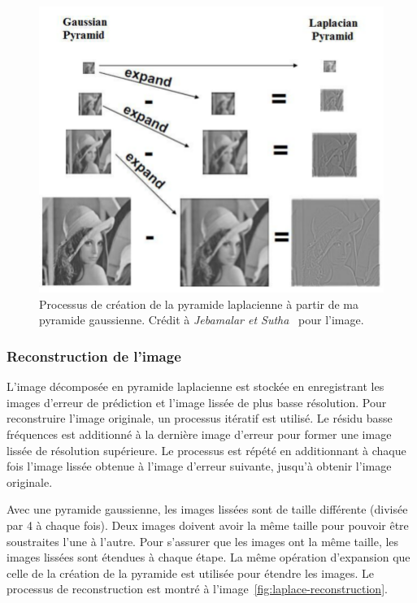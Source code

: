 \begin{figure}
    \centering
    \includegraphics[width=.75\textwidth]{contenu/resources/images/gauss_laplace_pyramid}
    \caption[Relation entre pyramide gaussienne et laplacienne]{Processus de création de la pyramide laplacienne à partir de ma pyramide gaussienne. Crédit à \textit{Jebamalar et Sutha}~\cite{jebamalar_design_2014} pour l'image.}
    \label{fig:gauss-laplace-pyramid}
\end{figure}

\subsubsection{Reconstruction de l'image}

L'image décomposée en pyramide laplacienne est stockée en enregistrant les images d'erreur de prédiction et l'image lissée de plus basse résolution. Pour reconstruire l'image originale, un processus itératif est utilisé. Le résidu basse fréquences est additionné à la dernière image d'erreur pour former une image lissée de résolution supérieure. Le processus est répété en additionnant à chaque fois l'image lissée obtenue à l'image d'erreur suivante, jusqu'à obtenir l'image originale.

\bigskip

Avec une pyramide gaussienne, les images lissées sont de taille différente (divisée par 4 à chaque fois). Deux images doivent avoir la même taille pour pouvoir être soustraites l'une à l'autre. Pour s'assurer que les images ont la même taille, les images lissées sont étendues à chaque étape. La même opération d'expansion que celle de la création de la pyramide est utilisée pour étendre les images. Le processus de reconstruction est montré à l'image~\ref{fig:laplace-reconstruction}.

